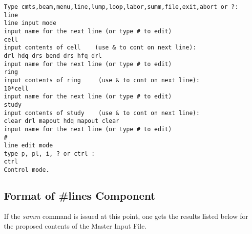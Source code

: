 \begin{footnotesize}
\begin{verbatim}
Type cmts,beam,menu,line,lump,loop,labor,summ,file,exit,abort or ?:
line
line input mode
input name for the next line (or type # to edit)
cell
input contents of cell    (use & to cont on next line):
drl hdq drs bend drs hfq drl
input name for the next line (or type # to edit)
ring
input contents of ring     (use & to cont on next line):
10*cell
input name for the next line (or type # to edit)
study
input contents of study    (use & to cont on next line):
clear drl mapout hdq mapout clear
input name for the next line (or type # to edit)
#
line edit mode
type p, pl, i, ? or ctrl :
ctrl
Control mode.
\end{verbatim}
\end{footnotesize}


\subsection{Format of \#lines Component} If the {\em summ} command is
issued at this point, one gets the results listed below for the proposed
contents of the Master Input File.

